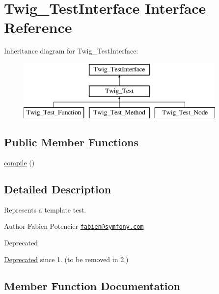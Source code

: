 \hypertarget{interface_twig___test_interface}{}\section{Twig\+\_\+\+Test\+Interface Interface Reference}
\label{interface_twig___test_interface}
Inheritance diagram for Twig\+\_\+\+Test\+Interface\+:\begin{figure}[H]
\begin{center}
\leavevmode
\includegraphics[height=3.000000cm]{interface_twig___test_interface}
\end{center}
\end{figure}
\subsection*{Public Member Functions}
\begin{DoxyCompactItemize}
\item 
\hyperlink{interface_twig___test_interface_a3815e7c2e73f00c2ebffcf5b90eef3b1}{compile} ()
\end{DoxyCompactItemize}


\subsection{Detailed Description}
Represents a template test.

\begin{DoxyAuthor}{Author}
Fabien Potencier \href{mailto:fabien@symfony.com}{\tt fabien@symfony.\+com} 
\end{DoxyAuthor}
\begin{DoxyRefDesc}{Deprecated}
\item[\hyperlink{deprecated__deprecated000026}{Deprecated}]since 1. (to be removed in 2.) \end{DoxyRefDesc}


\subsection{Member Function Documentation}
\hypertarget{interface_twig___test_interface_a3815e7c2e73f00c2ebffcf5b90eef3b1}{}
